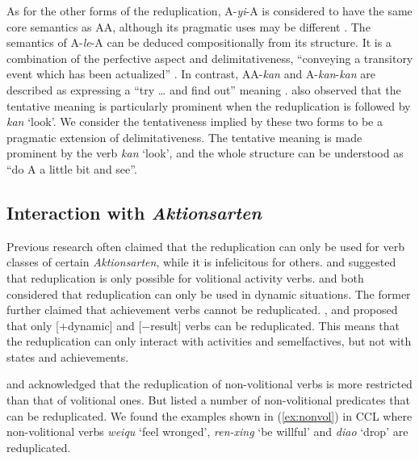 \documentclass[11pt,a4paper,fleqn,draft]{article}
\begin{document}
As for the other forms of the reduplication, 
A-\emph{yi}-A is considered to have the same core semantics as AA,
although its pragmatic uses may be different \citep{Yang2003}. 
The semantics of A-\emph{le}-A can be deduced compositionally from its structure. 
It is a combination of the perfective aspect and delimitativeness, ``conveying a transitory event which has been actualized'' \citep[151]{XiaoMcEnery2004}.
In contrast, AA-\emph{kan} and A-\emph{kan}-\emph{kan} are described as expressing a ``try \ldots{} and find out'' meaning \citep[63]{Cheng2012}.
\citet[290]{Tsao2001} also observed that the tentative meaning is particularly prominent when the reduplication is followed by \emph{kan} `look'.
We consider the tentativeness implied by these two forms to be a pragmatic extension of delimitativeness.
The tentative meaning is made prominent by the verb \emph{kan} `look',
and the whole structure can be understood as ``do A a little bit and see''.




\subsection{Interaction with \emph{Aktionsarten}}\label{sec:Aktionsarten}

Previous research often claimed that the reduplication can only be used for verb classes of certain \emph{Aktionsarten}, while it is infelicitous for others.
\citet[277--278]{Hong1999} and \citet[234--235]{LiThompson1981} suggested that reduplication is only possible for volitional activity verbs.
\citet[70--71]{Dai1997} and \citet[290]{Tsao2001} both considered that reduplication can only be used in dynamic situations.
The former further claimed that achievement verbs cannot be reduplicated.
\citet[20]{Arcodiaetal2014}, \citet{BascianoMelloni2017} and \citet[155]{XiaoMcEnery2004} proposed that only [$+$dynamic] and [$-$result] verbs can be reduplicated.
This means that the reduplication can only interact with activities and semelfactives, but not with states and achievements.

\citet[53]{Chen2001} and \citet[10--11]{Yang2003} acknowledged that the reduplication of non\hyp{}volitional verbs is more restricted than that of volitional ones.
But \citet[381--382]{Zhu1998} listed a number of non\hyp{}volitional predicates that can be reduplicated.
We found the examples shown in (\ref{ex:nonvol}) in CCL where non\hyp{}volitional verbs \emph{weiqu} `feel wronged', \emph{ren-xing} `be willful' and \emph{diao} `drop' are reduplicated.
\end{document}
